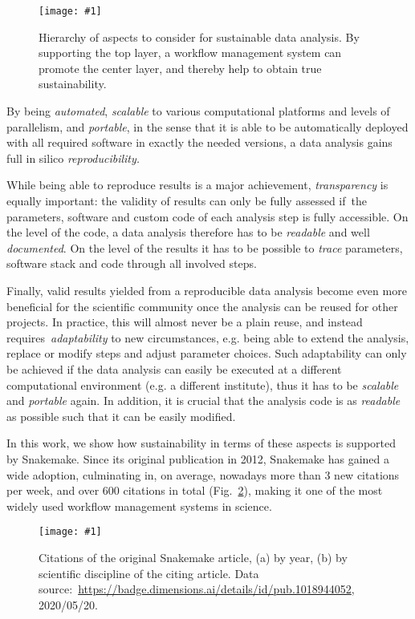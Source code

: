 \documentclass{scrartcl}
\newcommand{\image}[1]{\centering\texttt{[image: \#1]}}
\let\plainurl\url
\renewcommand{\url}[1]{\protect\plainurl{#1}}
\begin{document}
\begin{figure}
	\image{sustainability-in-wms.pdf}
	\caption{
		Hierarchy of aspects to consider for sustainable data analysis.
		By supporting the top layer, a workflow management system can promote the center layer, and thereby help to obtain true sustainability.
	}\label{fig:sustainability}
\end{figure}

By being \emph{automated}, \emph{scalable} to various computational platforms and levels of parallelism, and \emph{portable}, in the sense that it is able to be automatically deployed with all required software in exactly the needed versions, a data analysis gains full in silico \emph{reproducibility.
}

While being able to reproduce results is a major achievement, \emph{transparency} is equally important: the validity of results can only be fully assessed if~the parameters, software and custom code of each analysis step is fully accessible.
On the level of the code, a data analysis therefore has to be \emph{readable} and well \emph{documented}.
On the level of the results it has to be possible to \emph{trace} parameters, software stack and code through all involved steps.

Finally, valid results yielded from a reproducible data analysis become even more beneficial for the scientific community once the analysis can be reused for other projects.
In practice, this will almost never be a plain reuse, and instead requires~\emph{adaptability} to new circumstances, e.g. being able to extend the analysis, replace or modify steps and adjust parameter choices.
Such adaptability can only be achieved if the data analysis can easily be executed at a different computational environment (e.g. a different institute), thus it has to be \emph{scalable} and \emph{portable} again.
In addition, it is crucial that the analysis code is as \emph{readable} as possible such that it can be easily modified.

In this work, we show how sustainability in terms of these aspects is supported by Snakemake.
Since its original publication in 2012, Snakemake has gained a wide adoption, culminating in, on average, nowadays more than 3 new citations per week, and over 600 citations in total (Fig.~\ref{fig:citations}), making it one of the most widely used workflow management systems in science.

\begin{figure}
	\image{citations.pdf}
	\caption{
		Citations of the original Snakemake article, (a) by year, (b) by scientific discipline of the citing article.
		Data source:~\url{https://badge.dimensions.ai/details/id/pub.1018944052}, 2020/05/20.
	}
	\label{fig:citations}
\end{figure}
\end{document}
